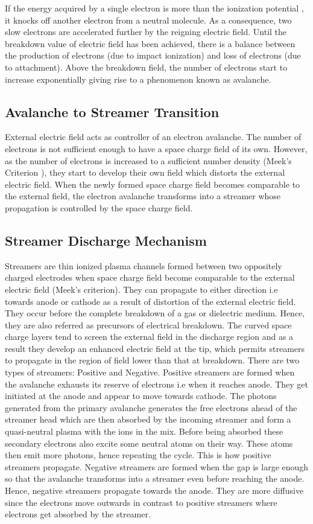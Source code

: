 \documentclass{article}
\begin{document}
If the energy acquired by a single electron is more than the ionization potential , it knocks off another electron from a neutral molecule. As a consequence, two slow electrons are accelerated further by the reigning electric field. Until the breakdown value of electric field has been achieved, there is a balance between the production of electrons (due to impact ionization) and loss of electrons (due to attachment). Above the breakdown field, the number of electrons start to increase exponentially giving rise to a phenomenon known as avalanche.

\subsection{Avalanche to Streamer Transition}
External electric field acts as controller of an electron avalanche. The number of electrons is not sufficient enough to have a space charge field of its own. However, as the number of electrons is increased to a sufficient number density (Meek's Criterion \cite{Raizer1991GasRazryada}), they start to develop their own field which distorts the external electric field. When the newly formed space charge field becomes comparable to the external field, the electron avalanche transforms into a streamer whose propagation is controlled by the space charge field. 

\subsection{Streamer Discharge Mechanism}

Streamers are thin ionized plasma channels formed between two oppositely charged electrodes when space charge field become comparable to the external electric field (Meek's criterion). They can propagate to either direction i.e towards anode or cathode as a result of distortion of the external electric field. They occur before the complete breakdown of a gas or dielectric medium. Hence, they are also referred as precursors of electrical breakdown.  The curved space charge layers tend to screen the external field in the discharge region and as a result they develop an enhanced electric field at the tip, which permits streamers to propagate in the region of field lower than that at breakdown. 
There are two types of streamers: Positive and Negative. Positive streamers are formed when the avalanche exhausts its reserve of electrons i.e when it reaches anode. They get initiated at the anode and appear to move towards cathode. The photons generated from the primary avalanche generates the free electrons ahead of the streamer head which are then absorbed by the incoming streamer and form a quasi-neutral plasma with the ions in the mix. Before being absorbed these secondary electrons also excite some neutral atoms on their way. These atoms then emit more photons, hence repeating the cycle. This is how positive streamers propagate. Negative streamers are formed when the gap is large enough so that the avalanche transforms into a streamer even before reaching the anode. Hence, negative streamers propagate towards the anode. They are more diffusive since the electrons move outwards in contrast to positive streamers where electrons get absorbed by the streamer.    
\end{document}
